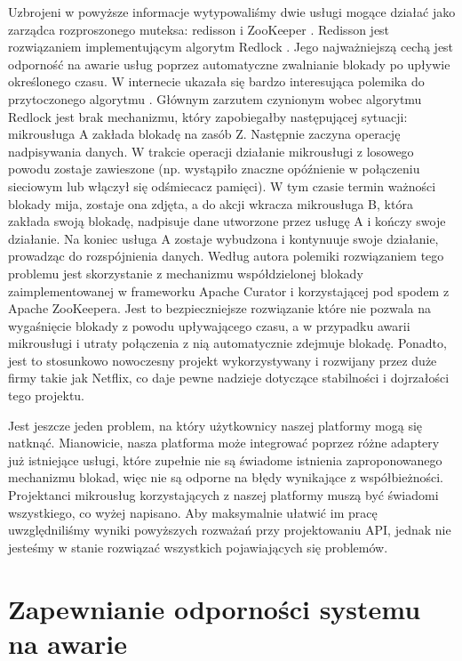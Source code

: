 \documentclass[licencjacka]{pracamgr}
\begin{document}
Uzbrojeni w powyższe informacje wytypowaliśmy dwie usługi mogące działać jako zarządca rozproszonego muteksa:
redisson \cite{redisson} i ZooKeeper \cite{zookeeper}. Redisson jest rozwiązaniem implementującym algorytm Redlock
\cite{redislock}. Jego najważniejszą cechą jest odporność na awarie usług poprzez automatyczne zwalnianie blokady
po upływie określonego czasu. W internecie ukazała się bardzo interesująca polemika do przytoczonego algorytmu \cite{redisbad}.
Głównym zarzutem czynionym wobec algorytmu Redlock jest brak mechanizmu, który zapobiegałby następującej sytuacji:
mikrousługa A zakłada blokadę na zasób Z. Następnie zaczyna operację nadpisywania danych. W trakcie operacji
działanie mikrousługi z losowego powodu zostaje zawieszone (np. wystąpiło znaczne opóźnienie w połączeniu sieciowym
lub włączył się odśmiecacz pamięci). W tym czasie termin ważności blokady mija, zostaje ona zdjęta, a do akcji
wkracza mikrousługa B, która zakłada swoją blokadę, nadpisuje dane utworzone przez usługę A i kończy swoje
działanie. Na koniec usługa A zostaje wybudzona i kontynuuje swoje działanie, prowadząc do rozspójnienia danych.
Według autora polemiki rozwiązaniem tego problemu jest skorzystanie z mechanizmu współdzielonej blokady
zaimplementowanej w frameworku Apache Curator \cite{curatorlock} i korzystającej pod spodem z Apache ZooKeepera.
Jest to bezpieczniejsze rozwiązanie które nie pozwala na wygaśnięcie blokady z powodu upływającego
czasu, a w przypadku awarii mikrousługi i utraty połączenia z nią
automatycznie zdejmuje blokadę. Ponadto, jest to stosunkowo nowoczesny projekt wykorzystywany i rozwijany przez
duże firmy takie jak Netflix, co daje pewne nadzieje dotyczące stabilności i dojrzałości tego projektu.

Jest jeszcze jeden problem, na który użytkownicy naszej platformy mogą się natknąć. Mianowicie, nasza platforma
może integrować poprzez różne adaptery już istniejące usługi, które zupełnie nie są świadome istnienia
zaproponowanego mechanizmu blokad, więc nie są odporne na błędy wynikające z współbieżności.
Projektanci mikrousług korzystających z naszej platformy muszą być świadomi wszystkiego, co wyżej napisano.
Aby maksymalnie ułatwić im pracę uwzględniliśmy wyniki powyższych rozważań przy projektowaniu API, jednak nie
jesteśmy w stanie rozwiązać wszystkich pojawiających się problemów.

\section{Zapewnianie odporności systemu na awarie}
\end{document}
